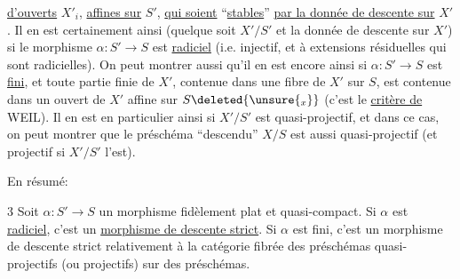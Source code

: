 \uline{d'ouverts} $X'_i$, \uline{affines sur} $S'$, \uline{qui soient} ``\uline{stables}'' \uline{par la donnée de descente sur} $X'$.  Il en est certainement ainsi (quelque soit $X'/S'$ et la donnée de descente sur $X'$) si le morphisme $\alpha:S'\longrightarrow S$ est \uline{radiciel} (i.e. injectif,  et à extensions résiduelles  qui sont radicielles). On peut montrer aussi qu'il en est encore ainsi si $\alpha:S'\longrightarrow S$ est \uline{fini}, et  toute partie finie de $X'$, contenue dans une fibre de $X'$ sur $S$, est contenue dans un ouvert  de $X'$ affine sur $S\deleted{\unsure{_x}}$ (c'est le \uline{critère de} WEIL).  Il en est en particulier ainsi si $X'/S'$ est quasi-projectif, et dans ce cas, on peut montrer que le préschéma ``descendu''  $X/S$ est aussi quasi-projectif (et projectif si $X'/S'$ l'est).

En résumé:

 3 Soit $\alpha:S'\longrightarrow S$ un morphisme  fidèlement plat et quasi-compact. Si $\alpha$ est \uline{radiciel}, c'est un \uline{morphisme de descente strict}. Si $\alpha$ est fini, c'est un morphisme de descente strict relativement à la catégorie fibrée des préschémas quasi-projectifs (ou projectifs) sur des préschémas.

